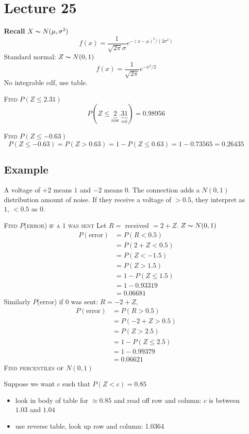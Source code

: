 \section{Lecture 25}
\textbf{Recall}
$ X \thicksim N(\mu,\sigma^2) $
\[ f(x)=\frac{1}{\sqrt{2\pi}\sigma}e^{-(x-\mu)^2/(2\sigma^2)}\]
Standard normal: $ Z \thicksim N(0,1) $
\[ f(x)=\frac{1}{\sqrt{2\pi}}e^{-x^2/2}\]
No integrable cdf, use table.

\textsc{Find $ P(Z\le 2.31) $}
\[ P(Z\le \underbrace{2}_{\text{row}}.\underbrace{31}_{\text{col}})=0.98956 \]

\textsc{Find $ P(Z\le-0.63) $}
\[ P(Z\le-0.63)=P(Z>0.63)=1-P(Z\le 0.63)=1-0.73565=0.26435\]

\subsection{Example}
A voltage of $ +2 $ means $ 1 $ and $ -2 $ means $ 0 $. The connection
adds a $ N(0,1) $ distribution amount of noise. If they receive a voltage of
$ >0.5 $, they interpret as $ 1 $, $ <0.5 $ as $ 0 $.

\textsc{Find $ P $(error) if a $ 1 $ was sent}
Let $ R = $ received $ =2+Z $. $ Z \thicksim N(0,1) $
\begin{align*}
    P(\text{error})&=P(R<0.5)\\
    &=P(2+Z<0.5)\\
    &=P(Z<-1.5)\\
    &=P(Z> 1.5)\\
    &=1-P(Z\le 1.5)\\
    &=1-0.93319\\
    &=0.06681
\end{align*}
Similarly $ P $(error) if $ 0 $ was sent: $ R=-2+Z $,
\begin{align*}
    P(\text{error})&=P(R>0.5)\\
    &=P(-2+Z>0.5)\\
    &=P(Z>2.5)\\
    &=1-P(Z\le 2.5)\\
    &=1-0.99379\\
    &=0.06621
\end{align*}
\textsc{Find percentiles of $ N(0,1) $}

Suppose we want $ c $ such that $ P(Z<c)=0.85 $
\begin{itemize}
    \item look in body of table for $ \approx 0.85 $ and read off row and column: $ c $ is between $ 1.03 $ and $ 1.04 $
    \item use reverse table, look up row and column: 1.0364
\end{itemize}

